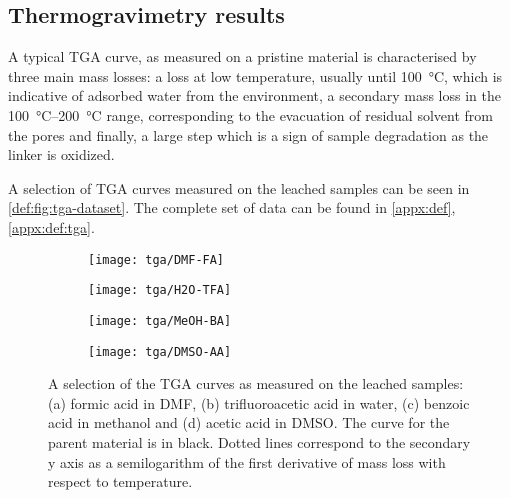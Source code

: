 
\subsection{Thermogravimetry results}

A typical \gls{TGA} curve, as measured on a pristine material
is characterised by three main mass losses: a loss
at low temperature, usually until \SI{100}{\degreeCelsius},
which is indicative of adsorbed water from the environment,
a secondary mass loss in the \SIrange{100}{200}{\degreeCelsius}
range, corresponding to the evacuation of residual solvent 
from the pores and finally, a large step which is a sign of 
sample degradation as the linker is oxidized.

A selection of \gls{TGA} curves measured on the leached samples
can be seen in \autoref{def:fig:tga-dataset}. The complete set of data
can be found in \autoref{appx:def}, \autoref{appx:def:tga}.

\begin{figure}[htbp]
    \centering

    \begin{subfigure}{0.5\linewidth}
        \texttt{[image: tga/DMF-FA]}%
		\caption{}%
        \label{def:fig:tga-dmf-fa}
    \end{subfigure}%
    \begin{subfigure}{0.5\linewidth}
        \texttt{[image: tga/H2O-TFA]}%
		\caption{}%
        \label{def:fig:tga-h2o-tfa}
    \end{subfigure}%

    
    \begin{subfigure}{0.5\linewidth}
        \texttt{[image: tga/MeOH-BA]}%
		\caption{}%
        \label{def:fig:tga-meoh-ba}
    \end{subfigure}%
    \begin{subfigure}{0.5\linewidth}
        \texttt{[image: tga/DMSO-AA]}%
		\caption{}%
        \label{def:fig:tga-dmso-aa}
    \end{subfigure}%

    \caption{A selection of the \gls{TGA} curves as measured on the
    leached samples: (a) formic acid in \gls{DMF}, (b) trifluoroacetic
    acid in water, (c) benzoic acid in methanol and (d) acetic acid
    in \gls{DMSO}. The curve for the parent material is in black. 
    Dotted lines correspond to the secondary y axis as a 
    semilogarithm of the first derivative of mass loss with 
    respect to temperature.}%
    \label{def:fig:tga-dataset}
\end{figure}

